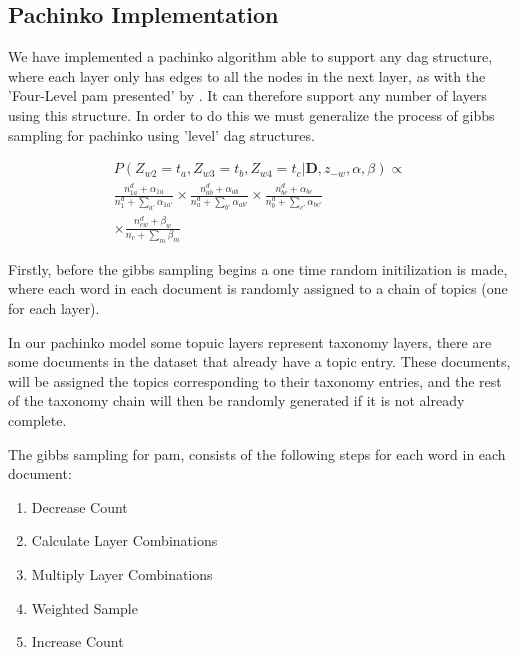 \subsection{Pachinko Implementation}
We have implemented a pachinko algorithm able to support any \gls{dag} structure, where each layer only has edges to all the nodes in the next layer, as with the 'Four-Level \gls{pam} presented' by \citet{li2006pachinko}.
It can therefore support any number of layers using this structure.
In order to do this we must generalize the process of gibbs sampling for pachinko using 'level' \gls{dag} structures.

\begin{equation}\label{eq:pachinko_gibbs}
	\begin{split}
		P(Z_{w2} = t_a, Z_{w3} = t_b, Z_{w4} = t_c | \textbf{D}, z_{-w}, \alpha, \beta) \propto \\
		\frac{n_{1a}^d + \alpha_{1a}}{n_1^d + \sum_{a'} \alpha_{1a'}} \times
		\frac{n_{ab}^d + \alpha_{ab}}{n_a^d + \sum_{b'} \alpha_{ab'}}  \times 
		\frac{n_{bc}^d + \alpha_{bc}}{n_{b}^d + \sum_{c'} \alpha_{bc'}} \\ \times 
		\frac{n_{cw}^d + \beta_{w}}{n_{c} + \sum_{m} \beta_{m}} 
	\end{split}
\end{equation}

Firstly, before the gibbs sampling begins a one time random initilization is made, where each word in each document is randomly assigned to a chain of topics (one for each layer).

In our pachinko model some topuic layers represent taxonomy layers, there are some documents in the dataset that already have a topic entry.
These documents, will be assigned the topics corresponding to their taxonomy entries, and the rest of the taxonomy chain will then be randomly generated if it is not already complete.

The gibbs sampling for \gls{pam}, consists of the following steps for each word in each document:

\begin{enumerate}
	\item Decrease Count
	\item Calculate Layer Combinations
	\item Multiply Layer Combinations
	\item Weighted Sample
	\item Increase Count
\end{enumerate}

